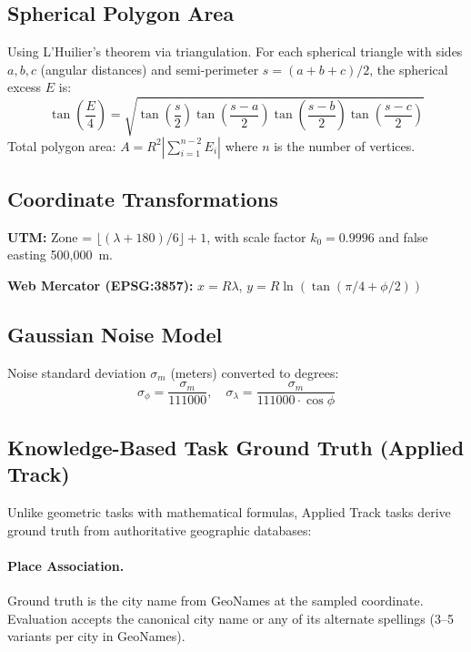 \subsection{Spherical Polygon Area}
Using L'Huilier's theorem via triangulation. For each spherical triangle with sides $a, b, c$ (angular distances) and semi-perimeter $s = (a+b+c)/2$, the spherical excess $E$ is:
\begin{equation}
\tan\!\left(\frac{E}{4}\right) = \sqrt{\tan\!\left(\frac{s}{2}\right) \tan\!\left(\frac{s-a}{2}\right) \tan\!\left(\frac{s-b}{2}\right) \tan\!\left(\frac{s-c}{2}\right)}
\end{equation}
Total polygon area: $A = R^2 \left|\sum_{i=1}^{n-2} E_i\right|$ where $n$ is the number of vertices.

\subsection{Coordinate Transformations}
\textbf{UTM:} Zone = $\lfloor(\lambda + 180)/6\rfloor + 1$, with scale factor $k_0 = 0.9996$ and false easting 500,000~m.

\textbf{Web Mercator (EPSG:3857):} $x = R\lambda$, $y = R \ln(\tan(\pi/4 + \phi/2))$

\subsection{Gaussian Noise Model}
Noise standard deviation $\sigma_m$ (meters) converted to degrees:
\begin{equation}
\sigma_\phi = \frac{\sigma_m}{111000}, \quad \sigma_\lambda = \frac{\sigma_m}{111000 \cdot \cos\phi}
\end{equation}

\subsection{Knowledge-Based Task Ground Truth (Applied Track)}

Unlike geometric tasks with mathematical formulas, Applied Track tasks derive ground truth from authoritative geographic databases:

\paragraph{Place Association.}
Ground truth is the city name from GeoNames at the sampled coordinate. Evaluation accepts the canonical city name or any of its alternate spellings (3--5 variants per city in GeoNames).

